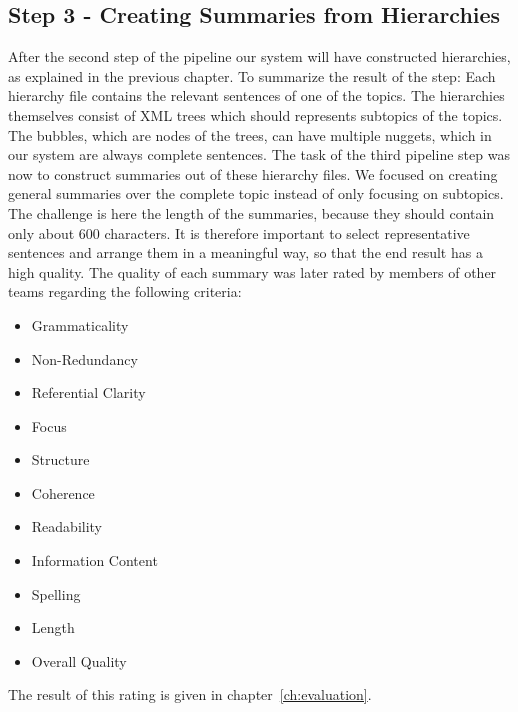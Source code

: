 
\subsection{Step 3 - Creating Summaries from Hierarchies}
After the second step of the pipeline our system will have constructed hierarchies,
as explained in the previous chapter. To summarize the result of the step: Each
hierarchy file contains the relevant sentences of one of the topics. The hierarchies
themselves consist of XML trees which should represents subtopics of the topics.
The bubbles, which are nodes of the trees, can have multiple nuggets, which in
our system are always complete sentences. The task of the third pipeline step
was now to construct summaries out of these hierarchy files. We focused on
creating general summaries over the complete topic instead of only focusing on
subtopics. The challenge is here the length of the summaries, because they should
contain only about 600 characters. It is therefore important to select
representative sentences and arrange them in a meaningful way, so that the end
result has a high quality. The quality of each summary was later rated by members
of other teams regarding the following criteria:
\begin{itemize}
    \item Grammaticality
    \item Non-Redundancy
    \item Referential Clarity
    \item Focus
    \item Structure
    \item Coherence
    \item Readability
    \item Information Content
    \item Spelling
    \item Length
    \item Overall Quality
\end{itemize}
The result of this rating is given in chapter~\ref{ch:evaluation}.

